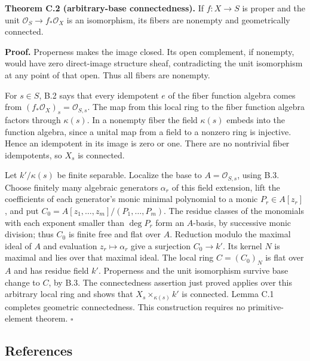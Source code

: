 \documentclass[11pt]{article}
\begin{document}
\textbf{Theorem C.2 (arbitrary-base connectedness).} If \(f:X\to S\) is
proper and the unit \(\mathcal O_S\to f_*\mathcal O_X\) is an
isomorphism, its fibers are nonempty and geometrically connected.

\textbf{Proof.} Properness makes the image closed. Its open complement,
if nonempty, would have zero direct-image structure sheaf, contradicting
the unit isomorphism at any point of that open. Thus all fibers are
nonempty.

For \(s\in S\), B.2 says that every idempotent \(e\) of the fiber
function algebra comes from \((f_*\mathcal O_X)_s=\mathcal O_{S,s}\).
The map from this local ring to the fiber function algebra factors
through \(\kappa(s)\). In a nonempty fiber the field \(\kappa(s)\)
embeds into the function algebra, since a unital map from a field to a
nonzero ring is injective. Hence an idempotent in its image is zero or
one. There are no nontrivial fiber idempotents, so \(X_s\) is connected.

Let \(k'/\kappa(s)\) be finite separable. Localize the base to
\(A=\mathcal O_{S,s}\), using B.3. Choose finitely many algebraic
generators \(\alpha_r\) of this field extension, lift the coefficients
of each generator's monic minimal polynomial to a monic
\(P_r\in A[z_r]\), and put \(C_0=A[z_1,\ldots,z_m]/(P_1,\ldots,P_m)\).
The residue classes of the monomials with each exponent smaller than
\(\deg P_r\) form an \(A\)-basis, by successive monic division; thus
\(C_0\) is finite free and flat over \(A\). Reduction modulo the maximal
ideal of \(A\) and evaluation \(z_r\mapsto\alpha_r\) give a surjection
\(C_0\to k'\). Its kernel \(N\) is maximal and lies over that maximal
ideal. The local ring \(C=(C_0)_N\) is flat over \(A\) and has residue
field \(k'\). Properness and the unit isomorphism survive base change to
\(C\), by B.3. The connectedness assertion just proved applies over this
arbitrary local ring and shows that \(X_s\times_{\kappa(s)}k'\) is
connected. Lemma C.1 completes geometric connectedness. This
construction requires no primitive-element theorem. \(\square\)

\subsection{References}\label{references}
\end{document}

